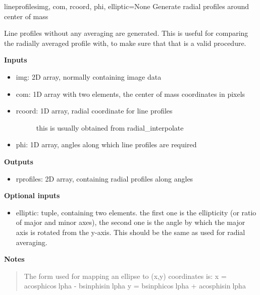 \documentclass[letterpaper,10pt,english]{manual}
\begin{document}
\hypertarget{imageprocess.lineprofiles}{}\begin{funcdesc}{lineprofiles}{img, com, rcoord, phi, elliptic=None}
Generate radial profiles around center of mass

Line profiles without any averaging are generated. This is useful for
comparing the radially averaged profile with, to make sure that that is a
valid procedure.

\textbf{Inputs}
\begin{itemize}
\item {} 
img: 2D array, normally containing image data

\item {} 
com: 1D array with two elements, the center of mass coordinates in pixels

\item {} \begin{description}
\item[rcoord: 1D array, radial coordinate for line profiles]
this is usually obtained from radial\_interpolate

\end{description}

\item {} 
phi: 1D array, angles along which line profiles are required

\end{itemize}

\textbf{Outputs}
\begin{itemize}
\item {} 
rprofiles: 2D array, containing radial profiles along angles

\end{itemize}

\textbf{Optional inputs}
\begin{itemize}
\item {} 
elliptic: tuple, containing two elements. the first one is the
ellipticity (or ratio of major and minor axes), the second one is the
angle by which the major axis is rotated from the y-axis. This should
be the same as used for radial averaging.

\end{itemize}

\textbf{Notes}
\begin{quote}

The form used for mapping an ellipse to (x,y) coordinates is:
x = acosphicoslpha - bsinphisinlpha
y = bsinphicoslpha + acosphisinlpha
\end{quote}
\end{funcdesc}
\end{document}
